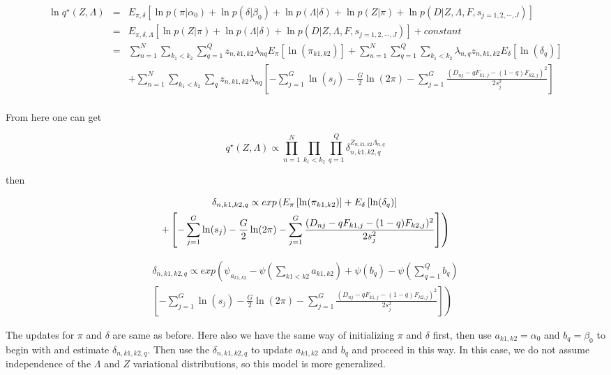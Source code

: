 \documentclass[12pt]{article}
\begin{document}
\begin{eqnarray}
\ln q^{\star} (Z, \Lambda)  & = & E_{\pi, \delta} \left [ \ln p(\pi|\alpha_0) + \ln p(\delta | \beta_0) + \ln p(\Lambda | \delta) + \ln p(Z | \pi) + \ln p(D | Z, \Lambda, F, s_{j=1,2,\cdots,J}) \right ] \\ \nonumber
  & = & E_{\pi, \delta, \Lambda} \left [ \ln p(Z | \pi) + \ln p(\Lambda | \delta) + \ln p(D | Z, \Lambda, F, s_{j=1,2,\cdots,J}) \right] + constant \\\nonumber
  & = & \sum_{n=1}^{N} \sum_{k_1 < k_2}\sum_{q=1}^{Q} z_{n, k1, k2} \lambda_{nq} E_{\pi} \left [ \ln (\pi_{k1,k2}) \right ] + \sum_{n=1}^{N} \sum_{q=1}^{Q} \sum_{k_1 < k_2} \lambda_{n,q} z_{n, k1, k2} E_{\delta} \left [ \ln (\delta_{q}) \right] \\ \nonumber
  &&  + \sum_{n=1}^{N} \sum_{k_1 < k_2}  \sum_{q} z_{n, k1, k2} \lambda_{nq} \left [ - \sum_{j=1}^{G} \ln (s_j) - \frac{G}{2} \ln (2 \pi) - \sum_{j=1}^{G} \frac{(D_{nj} - qF_{k1,j} - (1-q)F_{k2,j})^2}{2s^2_j} \right] \\ \nonumber
\end{eqnarray}

From here one can get 

$$ q^{\star}(Z, \Lambda) \propto \prod_{n=1}^{N} \prod_{k_1 < k_2} \prod_{q=1}^{Q} \delta_{n, k1, k2, q}^{Z_{n,k1,k2} \Lambda_{n,q}} $$

then 

\begin{multline}
 $$ \delta_{n, k1, k2, q} \propto exp \left (  E_{\pi} \left [ \ln (\pi_{k1,k2}) \right] +  E_{\delta} \left [ \ln (\delta_{q}) \right ] \right. \\
 \left . +  \left [ - \sum_{j=1}^{G} \ln (s_j)  - \frac{G}{2} \ln (2 \pi) - \sum_{j=1}^{G} \frac{(D_{nj} - qF_{k1,j} - (1-q)F_{k2,j})^2}{2s^2_j} \right] \right ) 
\end{multline}

\begin{multline}
  \delta_{n, k1, k2, q} \propto exp \left ( \psi_{a_{k1,k2}} - \psi(\sum_{k1 < k2} a_{k1,k2}) +   \psi(b_{q}) - \psi(\sum_{q=1}^{Q} b_{q}) \right . \\
  \left . \left [ - \sum_{j=1}^{G} \ln (s_j)  - \frac{G}{2} \ln (2 \pi) -  \sum_{j=1}^{G} \frac{(D_{nj} - qF_{k1,j} - (1-q)F_{k2,j})^2}{2s^2_j} \right] \right ) 
\end{multline}

The updates for $\pi$ and $\delta$ are same as before. Here also we have the same way of initializing $\pi$ and $\delta$ first, then use $a_{k1,k2}=\alpha_0$ and $b_{q}=\beta_0$ to begin with and estimate $\delta_{n,k1,k2,q}$. Then use the $\delta_{n,k1,k2,q}$ to update $a_{k1,k2}$ and $b_{q}$ and proceed in this way. In this case, we do not assume independence of the $\Lambda$ and $Z$ variational distributions, so this model is more generalized.
\end{document}
